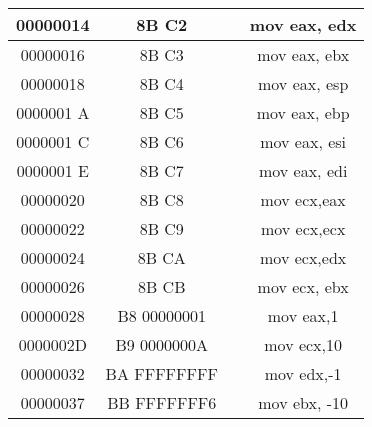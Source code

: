 \documentclass[10pt]{article}
\begin{document}
\begin{center}
\begin{tabular}{|c|c|c|c|}
\hline
00000014 & 8B C2 &  & mov eax, edx \\
\hline
00000016 & 8B C3 &  & mov eax, ebx \\
\hline
00000018 & 8B C4 &  & mov eax, esp \\
\hline
0000001 A & 8B C5 &  & mov eax, ebp \\
\hline
0000001 C & 8B C6 &  & mov eax, esi \\
\hline
0000001 E & 8B C7 &  & mov eax, edi \\
\hline
00000020 & 8B C8 &  & mov ecx,eax \\
\hline
00000022 & 8B C9 &  & mov ecx,ecx \\
\hline
00000024 & 8B CA &  & mov ecx,edx \\
\hline
00000026 & 8B CB &  & mov ecx, ebx \\
\hline
00000028 & B8 00000001 &  & mov eax,1 \\
\hline
0000002D & B9 0000000A &  & mov ecx,10 \\
\hline
00000032 & BA FFFFFFFF &  & mov edx,-1 \\
\hline
00000037 & BB FFFFFFF6 &  & mov ebx, -10 \\
\hline
\end{tabular}
\end{center}
\end{document}
